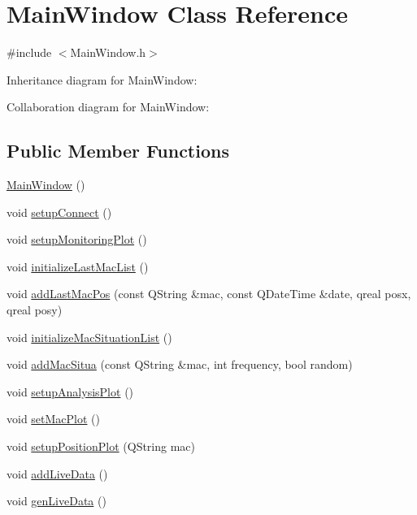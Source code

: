 \hypertarget{class_main_window}{}\section{Main\+Window Class Reference}
\label{class_main_window}


{\ttfamily \#include $<$Main\+Window.\+h$>$}



Inheritance diagram for Main\+Window\+:


Collaboration diagram for Main\+Window\+:
\subsection*{Public Member Functions}
\begin{DoxyCompactItemize}
\item 
\hyperlink{class_main_window_a34c4b4207b46d11a4100c9b19f0e81bb}{Main\+Window} ()
\item 
void \hyperlink{class_main_window_af0e6678a3e8aec9bd72220299c17825a}{setup\+Connect} ()
\item 
void \hyperlink{class_main_window_ac5366ffa03d44a3a76e4fb259676f8e5}{setup\+Monitoring\+Plot} ()
\item 
void \hyperlink{class_main_window_aa3df0144e4ca4f616bdb0b0dab87f6bd}{initialize\+Last\+Mac\+List} ()
\item 
void \hyperlink{class_main_window_a6253fe0e0f06ecee8474453d0f0321d0}{add\+Last\+Mac\+Pos} (const Q\+String \&mac, const Q\+Date\+Time \&date, qreal posx, qreal posy)
\item 
void \hyperlink{class_main_window_a23772b94e161e6e2e5529167efd48037}{initialize\+Mac\+Situation\+List} ()
\item 
void \hyperlink{class_main_window_a74f25cc26b4fa6af344c8ffca35b000e}{add\+Mac\+Situa} (const Q\+String \&mac, int frequency, bool random)
\item 
void \hyperlink{class_main_window_a0021497d1ed74835ebef527f99c9f658}{setup\+Analysis\+Plot} ()
\item 
void \hyperlink{class_main_window_ad22d851ff76ed4437bd8d3bb24d5571d}{set\+Mac\+Plot} ()
\item 
void \hyperlink{class_main_window_a14ceceafe4942bdc557a884ef116e7d8}{setup\+Position\+Plot} (Q\+String mac)
\item 
void \hyperlink{class_main_window_a55cbd37d45de540c0b6ada477bbd9029}{add\+Live\+Data} ()
\item 
void \hyperlink{class_main_window_a9793bf5dbf95a30840b022fcf9689ebc}{gen\+Live\+Data} ()

\end{DoxyCompactItemize}
